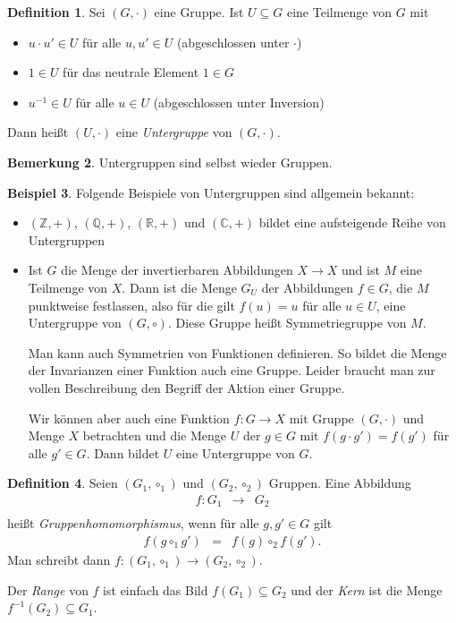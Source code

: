 \documentclass[index=totoc]{scrartcl}%
\theoremstyle{definition}
\newtheorem{defi}{Definition}[section]
\newtheorem{bem}[defi]{Bemerkung}
\newtheorem{bsp}[defi]{Beispiel}
\newcommand{\Z}{\mathbb Z}
\newcommand{\Q}{\mathbb Q}
\newcommand{\R}{\mathbb R}
\newcommand{\C}{\mathbb C}
\begin{document}
\begin{defi}
  Sei $(G,\cdot)$ eine Gruppe.
  Ist $U\subseteq G$ eine Teilmenge von $G$ mit
  \begin{itemize}
  \item
    $u\cdot u'\in U$ für alle $u,u'\in U$ (abgeschlossen unter $\cdot$)
  \item
    $1\in U$ für das neutrale Element $1\in G$ 
  \item
    $u^{-1}\in U$ für alle $u\in U$ (abgeschlossen unter Inversion)
  \end{itemize}
  Dann heißt $(U,\cdot)$ eine {\em Untergruppe} von $(G, \cdot)$. 
\end{defi}

\begin{bem}
  Untergruppen sind selbst wieder Gruppen. 
\end{bem}

\begin{bsp}
  Folgende Beispiele von Untergruppen sind allgemein bekannt:
  \begin{itemize}
  \item
    $(\Z,+)$, $(\Q,+)$, $(\R,+)$ und $(\C,+)$
    bildet eine aufsteigende Reihe von Untergruppen 
  \item
    Ist $G$ die Menge der invertierbaren Abbildungen $X\to X$
    und ist $M$ eine Teilmenge von $X$.
    Dann ist die Menge $G_U$ der Abbildungen $f\in G$,
    die $M$ punktweise festlassen,
    also für die gilt $f(u)=u$ für alle $u\in U$,
    eine Untergruppe von $(G,\circ)$.
    Diese Gruppe heißt Symmetriegruppe von $M$.

    Man kann auch Symmetrien von Funktionen definieren.
    So bildet die Menge der Invarianzen einer Funktion auch eine Gruppe.
    Leider braucht man zur vollen Beschreibung
    den Begriff der Aktion einer Gruppe.

    Wir können aber auch eine Funktion $f\colon G\to X$
    mit Gruppe $(G,\cdot)$ und Menge $X$ betrachten
    und die Menge $U$ der $g\in G$ mit $f(g\cdot g')=f(g')$ für alle $g'\in G$.
    Dann bildet $U$ eine Untergruppe von $G$. 
  \end{itemize}
\end{bsp}

\begin{defi}
  Seien $(G_1,\circ_1)$ und $(G_2,\circ_2)$ Gruppen.
  Eine Abbildung
  \begin{eqnarray*}
    f\colon G_1 & \to & G_2 \\
  \end{eqnarray*}
  heißt {\em Gruppenhomomorphismus},
  wenn für alle $g,g'\in G$ gilt
  \begin{eqnarray*}
    f(g\circ_1g') & = & f(g)\circ_2f(g').
  \end{eqnarray*}
  Man schreibt dann $f\colon(G_1,\circ_1)\to(G_2,\circ_2)$.

  Der {\em Range} von $f$ ist einfach das Bild $f(G_1)\subseteq G_2$
  und der {\em Kern} ist die Menge $f^{-1}(G_2)\subseteq G_1$. 
\end{defi}
\end{document}
